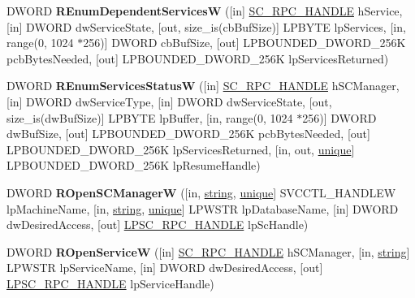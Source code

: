 \begin{DoxyCompactItemize}
\item 
\mbox{\label{interfacesvcctl_a039a1624d94db98d637507eadafc9473}} 
D\+W\+O\+RD {\bfseries R\+Enum\+Dependent\+ServicesW} (\mbox{[}in\mbox{]} \hyperlink{interfacevoid}{S\+C\+\_\+\+R\+P\+C\+\_\+\+H\+A\+N\+D\+LE} h\+Service, \mbox{[}in\mbox{]} D\+W\+O\+RD dw\+Service\+State, \mbox{[}out, size\+\_\+is(cb\+Buf\+Size)\mbox{]} L\+P\+B\+Y\+TE lp\+Services, \mbox{[}in, range(0, 1024 $\ast$256)\mbox{]} D\+W\+O\+RD cb\+Buf\+Size, \mbox{[}out\mbox{]} L\+P\+B\+O\+U\+N\+D\+E\+D\+\_\+\+D\+W\+O\+R\+D\+\_\+256K pcb\+Bytes\+Needed, \mbox{[}out\mbox{]} L\+P\+B\+O\+U\+N\+D\+E\+D\+\_\+\+D\+W\+O\+R\+D\+\_\+256K lp\+Services\+Returned)
\item 
\mbox{\label{interfacesvcctl_ab621b1b7af9a918713212404a01d2f6b}} 
D\+W\+O\+RD {\bfseries R\+Enum\+Services\+StatusW} (\mbox{[}in\mbox{]} \hyperlink{interfacevoid}{S\+C\+\_\+\+R\+P\+C\+\_\+\+H\+A\+N\+D\+LE} h\+S\+C\+Manager, \mbox{[}in\mbox{]} D\+W\+O\+RD dw\+Service\+Type, \mbox{[}in\mbox{]} D\+W\+O\+RD dw\+Service\+State, \mbox{[}out, size\+\_\+is(dw\+Buf\+Size)\mbox{]} L\+P\+B\+Y\+TE lp\+Buffer, \mbox{[}in, range(0, 1024 $\ast$256)\mbox{]} D\+W\+O\+RD dw\+Buf\+Size, \mbox{[}out\mbox{]} L\+P\+B\+O\+U\+N\+D\+E\+D\+\_\+\+D\+W\+O\+R\+D\+\_\+256K pcb\+Bytes\+Needed, \mbox{[}out\mbox{]} L\+P\+B\+O\+U\+N\+D\+E\+D\+\_\+\+D\+W\+O\+R\+D\+\_\+256K lp\+Services\+Returned, \mbox{[}in, out, \hyperlink{interfaceunique}{unique}\mbox{]} L\+P\+B\+O\+U\+N\+D\+E\+D\+\_\+\+D\+W\+O\+R\+D\+\_\+256K lp\+Resume\+Handle)
\item 
\mbox{\label{interfacesvcctl_aae542c7f28817b880d9d86c6a22630be}} 
D\+W\+O\+RD {\bfseries R\+Open\+S\+C\+ManagerW} (\mbox{[}in, \hyperlink{structstring}{string}, \hyperlink{interfaceunique}{unique}\mbox{]} S\+V\+C\+C\+T\+L\+\_\+\+H\+A\+N\+D\+L\+EW lp\+Machine\+Name, \mbox{[}in, \hyperlink{structstring}{string}, \hyperlink{interfaceunique}{unique}\mbox{]} L\+P\+W\+S\+TR lp\+Database\+Name, \mbox{[}in\mbox{]} D\+W\+O\+RD dw\+Desired\+Access, \mbox{[}out\mbox{]} \hyperlink{interfacevoid}{L\+P\+S\+C\+\_\+\+R\+P\+C\+\_\+\+H\+A\+N\+D\+LE} lp\+Sc\+Handle)
\item 
\mbox{\label{interfacesvcctl_ad5737841bbef37d343c8082a2b504499}} 
D\+W\+O\+RD {\bfseries R\+Open\+ServiceW} (\mbox{[}in\mbox{]} \hyperlink{interfacevoid}{S\+C\+\_\+\+R\+P\+C\+\_\+\+H\+A\+N\+D\+LE} h\+S\+C\+Manager, \mbox{[}in, \hyperlink{structstring}{string}\mbox{]} L\+P\+W\+S\+TR lp\+Service\+Name, \mbox{[}in\mbox{]} D\+W\+O\+RD dw\+Desired\+Access, \mbox{[}out\mbox{]} \hyperlink{interfacevoid}{L\+P\+S\+C\+\_\+\+R\+P\+C\+\_\+\+H\+A\+N\+D\+LE} lp\+Service\+Handle)

\end{DoxyCompactItemize}
